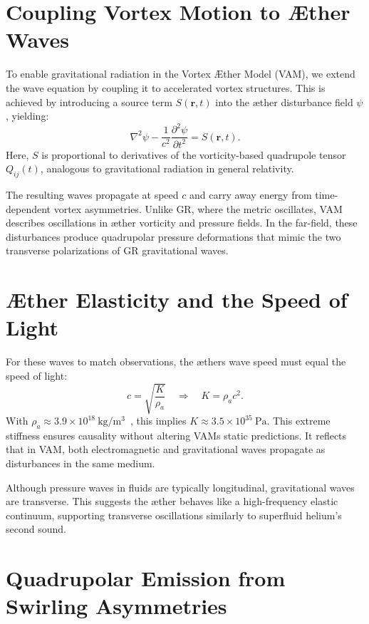 \section*{Coupling Vortex Motion to Æther Waves}

To enable gravitational radiation in the Vortex Æther Model (VAM), we extend the wave equation by coupling it to accelerated vortex structures. This is achieved by introducing a source term $S(\mathbf{r}, t)$ into the æther disturbance field $\psi$, yielding:
\begin{equation}
\nabla^2 \psi - \frac{1}{c^2} \frac{\partial^2 \psi}{\partial t^2} = S(\mathbf{r}, t).
\end{equation}
Here, $S$ is proportional to derivatives of the vorticity-based quadrupole tensor $Q_{ij}(t)$, analogous to gravitational radiation in general relativity.

The resulting waves propagate at speed $c$ and carry away energy from time-dependent vortex asymmetries. Unlike GR, where the metric oscillates, VAM describes oscillations in æther vorticity and pressure fields. In the far-field, these disturbances produce quadrupolar pressure deformations that mimic the two transverse polarizations of GR gravitational waves.

\section*{Æther Elasticity and the Speed of Light}

For these waves to match observations, the æther\rqs s wave speed must equal the speed of light:
\begin{equation}
c = \sqrt{\frac{K}{\rho_a}} \quad \Rightarrow \quad K = \rho_a c^2.
\end{equation}
With $\rho_a \approx 3.9 \times 10^{18}~\mathrm{kg/m^3}$~\cite{iskandarani2025VAM2}, this implies $K \approx 3.5 \times 10^{35}~\mathrm{Pa}$. This extreme stiffness ensures causality without altering VAM\rqs s static predictions. It reflects that in VAM, both electromagnetic and gravitational waves propagate as disturbances in the same medium.

Although pressure waves in fluids are typically longitudinal, gravitational waves are transverse. This suggests the æther behaves like a high-frequency elastic continuum, supporting transverse oscillations similarly to superfluid helium's second sound.

\section*{Quadrupolar Emission from Swirling Asymmetries}

